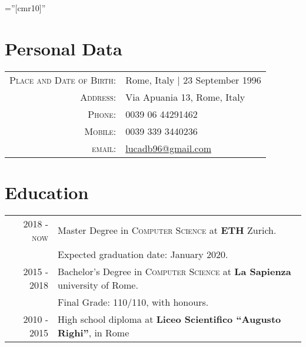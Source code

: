 \documentclass[a4paper,10pt]{article} %
\begin{document}
\pagestyle{empty} %

\font\fb=''[cmr10]'' %

\bigskip
\bigskip

\par{\bigskip\par} %

\section{Personal Data}

\begin{tabular}{rl}
\textsc{Place and Date of Birth:} & Rome, Italy  | 23 September 1996 \\
\textsc{Address:} & Via Apuania 13, Rome, Italy \\
\textsc{Phone:} & 0039 06 44291462\\
\textsc{Mobile:} & 0039 339 3440236\\
\textsc{email:} & \href{lucadb96@gmail.com}{lucadb96@gmail.com}
\end{tabular}

\bigskip

\section{Education}
\begin{tabular}{rl}
\textsc{2018 - now} & Master Degree in \textsc{Computer Science} at \textbf{ETH} Zurich.\\
&Expected graduation date: January 2020.\\
\textsc{2015 - 2018} & Bachelor's Degree in \textsc{Computer Science} at \textbf{La Sapienza} university of Rome.\\
&Final Grade: 110/110, with honours.\\
\textsc{2010 - 2015} & High school diploma at \textbf{Liceo Scientifico ``Augusto Righi''}, in Rome
\end{tabular}
\end{document}
